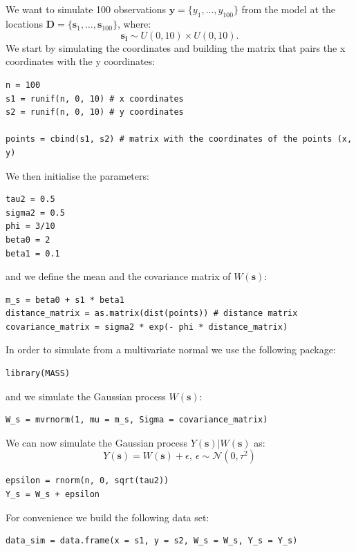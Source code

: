 \documentclass[a4paper,12pt]{article}
\begin{document}
\subsection{}
We want to simulate 100 observations \(\mathbf{y} = \{y_1, ..., y_{100} \}\) from the model at the locations \( \mathbf{D} = \{ \mathbf{s}_1, \dots, \mathbf{s}_{100} \} \), where:
\begin{equation*}
    \mathbf{s_i} \sim U(0,10) \times U(0,10).
\end{equation*}
We start by simulating the coordinates and building the matrix that pairs the x coordinates with the y coordinates:
\begin{lstlisting}[style=R]
n = 100
s1 = runif(n, 0, 10) # x coordinates
s2 = runif(n, 0, 10) # y coordinates

points = cbind(s1, s2) # matrix with the coordinates of the points (x, y)
\end{lstlisting}
We then initialise the parameters:
\begin{lstlisting}[style=R]
tau2 = 0.5
sigma2 = 0.5
phi = 3/10
beta0 = 2
beta1 = 0.1
\end{lstlisting}
and we define the mean and the covariance matrix of \(W(\mathbf{s})\):
\begin{lstlisting}[style=R]
m_s = beta0 + s1 * beta1
distance_matrix = as.matrix(dist(points)) # distance matrix
covariance_matrix = sigma2 * exp(- phi * distance_matrix)
\end{lstlisting}
In order to simulate from a multivariate normal we use the following package:
\begin{lstlisting}[style=R]
library(MASS)
\end{lstlisting}
and we simulate the Gaussian process \(W(\mathbf{s})\):
\begin{lstlisting}[style=R]
W_s = mvrnorm(1, mu = m_s, Sigma = covariance_matrix)
\end{lstlisting}
We can now simulate the Gaussian process \(Y(\mathbf{s})|W(\mathbf{s})\) as:
\begin{equation*}
    Y(\mathbf{s}) = W(\mathbf{s}) + \epsilon, \ \epsilon \sim \mathcal{N}(0, \tau^2)
\end{equation*}
\begin{lstlisting}[style=R]
epsilon = rnorm(n, 0, sqrt(tau2))
Y_s = W_s + epsilon
\end{lstlisting}
For convenience we build the following data set:
\begin{lstlisting}[style=R]
data_sim = data.frame(x = s1, y = s2, W_s = W_s, Y_s = Y_s)
\end{lstlisting}
\end{document}
